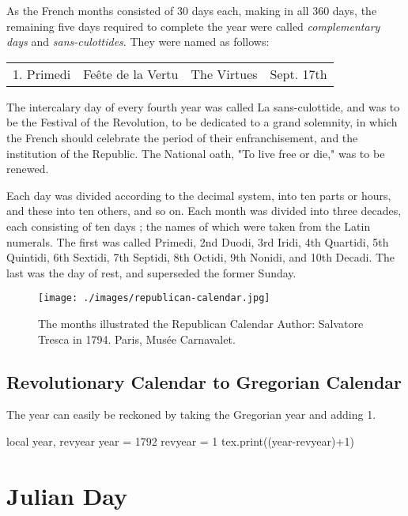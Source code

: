 As the French months consisted of 30 days each, making in all 360 days, the remaining five days required to complete the year were called \textit{complementary days} and \textit{sans-culottides}. They were named as follows:

\begin{tabular}{llll}
1. Primedi  & Fe\^ete de la Vertu  & The Virtues & Sept. 17th \\
\end{tabular}

The intercalary day of every fourth year was called La  sans-culottide, and was to be the Festival of 
the Revolution,  to be dedicated to a grand solemnity, in which the French should celebrate the period of their enfranchisement, and the  institution of the Republic. The National oath, "To live  free or die," was to be renewed. 

Each day was divided according to the decimal system, 
into ten parts or hours, and these into ten others, and so on. 
Each month was divided into three decades, each consisting of ten days ; 
the names of which were taken from the 
Latin numerals. The first was called Primedi, 2nd Duodi, 3rd 
Iridi, 4th Quartidi, 5th Quintidi, 6th Sextidi, 7th Septidi, 8th 
Octidi, 9th Nonidi, and 10th Decadi. The last was the day 
of rest, and superseded the former Sunday. 

\begin{figure}[htp]
\centering
\texttt{[image: ./images/republican-calendar.jpg]}
\caption{The months illustrated the Republican Calendar  
Author: Salvatore Tresca in 1794. 
Paris, Musée Carnavalet. }
\end{figure}

\subsection{Revolutionary Calendar to Gregorian Calendar}

The year can easily be reckoned by taking the Gregorian year and adding 1. 

\begin{luacode}
local year, revyear
year = 1792
revyear = 1
tex.print((year-revyear)+1)

\end{luacode}



\section{Julian Day}








 
  
    



